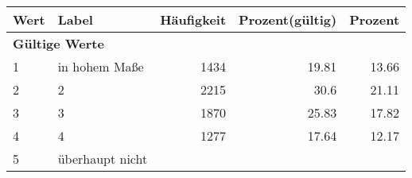      \begin{longtable}{lXrrr}
     \toprule
     \textbf{Wert} & \textbf{Label} & \textbf{Häufigkeit} & \textbf{Prozent(gültig)} & \textbf{Prozent} \\
     \endhead
     \midrule
     \multicolumn{5}{l}{\textbf{Gültige Werte}}\\

     1 &
     \multicolumn{1}{X}{ in hohem Maße   } &


       \num{1434} &
       \num[round-mode=places,round-precision=2]{19,81} &
         \num[round-mode=places,round-precision=2]{13,66} \\

     2 &
     \multicolumn{1}{X}{ 2   } &


       \num{2215} &
       \num[round-mode=places,round-precision=2]{30,6} &
         \num[round-mode=places,round-precision=2]{21,11} \\

     3 &
     \multicolumn{1}{X}{ 3   } &


       \num{1870} &
       \num[round-mode=places,round-precision=2]{25,83} &
         \num[round-mode=places,round-precision=2]{17,82} \\

     4 &
     \multicolumn{1}{X}{ 4   } &


       \num{1277} &
       \num[round-mode=places,round-precision=2]{17,64} &
         \num[round-mode=places,round-precision=2]{12,17} \\

     5 &
     \multicolumn{1}{X}{ überhaupt nicht   } &



\end{longtable}
